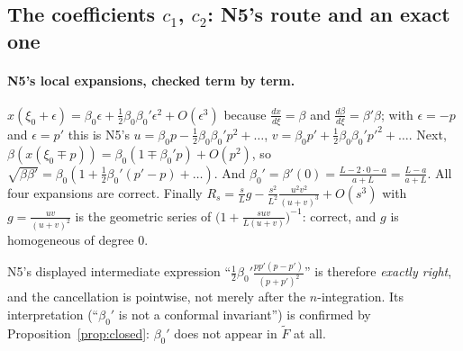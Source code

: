 \documentclass[11pt]{article}
\begin{document}
\subsection{The coefficients $c_1$, $c_2$: N5's route and an exact one}

\paragraph{N5's local expansions, checked term by term.}
$x(\xi_0+\epsilon)=\beta_0\epsilon+\tfrac12\beta_0\beta_0'\epsilon^2+O(\epsilon^3)$ because
$\frac{dx}{d\xi}=\beta$ and $\frac{d\beta}{d\xi}=\beta'\beta$; with $\epsilon=-p$ and $\epsilon=p'$
this is N5's $u=\beta_0p-\tfrac12\beta_0\beta_0'p^2+\dots$,
$v=\beta_0p'+\tfrac12\beta_0\beta_0'p'^2+\dots$.  Next,
$\beta(x(\xi_0\mp p))=\beta_0(1\mp\beta_0'p)+O(p^2)$, so
$\sqrt{\beta\beta'}=\beta_0(1+\tfrac12\beta_0'(p'-p)+\dots)$.  And
$\beta_0'=\beta'(0)=\frac{L-2\cdot0-a}{a+L}=\frac{L-a}{a+L}$.  All four expansions are correct.
Finally $R_s=\frac sLg-\frac{s^2}{L^2}\frac{u^2v^2}{(u+v)^3}+O(s^3)$ with $g=\frac{uv}{(u+v)^2}$
is the geometric series of $\bigl(1+\frac{suv}{L(u+v)}\bigr)^{-1}$: correct, and $g$ is
homogeneous of degree $0$.

\lproof
{}

\lproof
{}

N5's displayed intermediate expression
``$\tfrac12\beta_0'\frac{pp'(p-p')}{(p+p')^2}$'' is therefore \emph{exactly right}, and the
cancellation is pointwise, not merely after the $n$-integration.  Its interpretation
(``$\beta_0'$ is not a conformal invariant'') is confirmed by Proposition~\ref{prop:closed}:
$\beta_0'$ does not appear in $\widetilde F$ at all.
\end{document}
